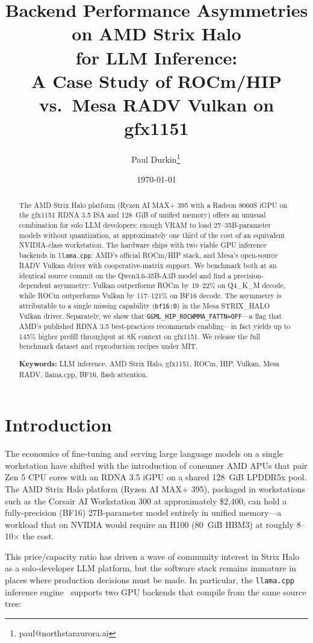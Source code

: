 \documentclass[10pt,a4paper]{article}
\title{\Large Backend Performance Asymmetries on AMD Strix Halo \\
       for LLM Inference: \\
       \large A Case Study of ROCm/HIP vs.\ Mesa RADV Vulkan on gfx1151}
\author[1]{Paul Durkin\thanks{paul@northstaraurora.ai}\,\orcidlink{0009-0000-2537-1578}}
\affil[1]{NorthStar Aurora}
\date{\today}
\begin{document}
\maketitle

\begin{abstract}
The AMD Strix Halo platform (Ryzen AI MAX+ 395 with a Radeon 8060S iGPU on the gfx1151 RDNA 3.5 ISA and 128~GiB of unified memory) offers an unusual combination for solo LLM developers: enough VRAM to load 27--35B-parameter models without quantization, at approximately one third of the cost of an equivalent NVIDIA-class workstation. The hardware ships with two viable GPU inference backends in \texttt{llama.cpp}: AMD's official ROCm/HIP stack, and Mesa's open-source RADV Vulkan driver with cooperative-matrix support. We benchmark both at an identical source commit on the Qwen3.6-35B-A3B model and find a precision-dependent asymmetry: Vulkan outperforms ROCm by 19--22\% on Q4\_K\_M decode, while ROCm outperforms Vulkan by 117--121\% on BF16 decode. The asymmetry is attributable to a single missing capability (\texttt{bf16:0}) in the Mesa STRIX\_HALO Vulkan driver. Separately, we show that \texttt{GGML\_HIP\_ROCWMMA\_FATTN=OFF}---a flag that AMD's published RDNA 3.5 best-practices recommends enabling---in fact yields up to 145\% higher prefill throughput at 8K context on gfx1151. We release the full benchmark dataset and reproduction recipes under MIT.

\textbf{Keywords:} LLM inference, AMD Strix Halo, gfx1151, ROCm, HIP, Vulkan, Mesa RADV, llama.cpp, BF16, flash attention.
\end{abstract}

\section{Introduction}

The economics of fine-tuning and serving large language models on a single workstation have shifted with the introduction of consumer AMD APUs that pair Zen 5 CPU cores with an RDNA 3.5 iGPU on a shared 128~GiB LPDDR5x pool. The AMD Strix Halo platform (Ryzen AI MAX+ 395), packaged in workstations such as the Corsair AI Workstation 300 at approximately \$2,400, can hold a fully-precision (BF16) 27B-parameter model entirely in unified memory---a workload that on NVIDIA would require an H100 (80~GiB HBM3) at roughly 8--10$\times$ the cost.

This price/capacity ratio has driven a wave of community interest in Strix Halo as a solo-developer LLM platform, but the software stack remains immature in places where production decisions must be made. In particular, the \texttt{llama.cpp} inference engine~\cite{llamacpp} supports two GPU backends that compile from the same source tree:
\end{document}
